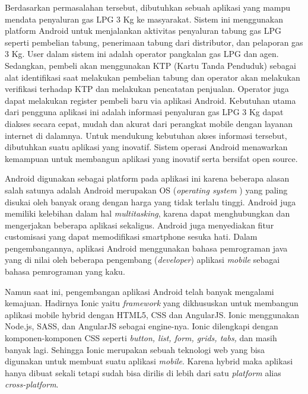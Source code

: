 \par Berdasarkan permasalahan tersebut, dibutuhkan sebuah aplikasi yang mampu mendata penyaluran gas LPG 3 Kg ke masyarakat. Sistem ini menggunakan platform Android untuk menjalankan aktivitas penyaluran tabung gas LPG seperti pembelian tabung, penerimaan tabung dari distributor, dan pelaporan gas 3 Kg. User dalam sistem ini adalah operator pangkalan gas LPG dan agen. Sedangkan, pembeli akan menggunakan KTP (Kartu Tanda Penduduk) sebagai alat identifikasi saat melakukan pembelian tabung dan operator akan melakukan verifikasi terhadap KTP dan melakukan pencatatan penjualan. Operator juga dapat melakukan register pembeli baru via aplikasi Android. Kebutuhan utama dari pengguna aplikasi ini adalah informasi penyaluran gas LPG 3 Kg dapat diakses secara cepat, mudah dan akurat dari perangkat mobile dengan layanan internet di dalamnya. Untuk mendukung kebutuhan akses informasi tersebut, dibutuhkan suatu aplikasi yang inovatif. Sistem operasi Android menawarkan kemampuan untuk membangun aplikasi yang inovatif serta bersifat open source.
\par Android digunakan sebagai platform pada aplikasi ini karena beberapa alasan salah satunya adalah Android merupakan OS (\textit{operating system }) yang paling disukai oleh banyak orang dengan harga yang tidak terlalu tinggi. Android juga memiliki kelebihan dalam hal \textit{multitasking}, karena dapat menghubungkan dan mengerjakan beberapa aplikasi sekaligus. Android juga menyediakan fitur customisasi yang dapat memodifikasi smartphone sesuka hati. Dalam pengembangannya, aplikasi Android menggunakan bahasa pemrograman java yang di nilai oleh beberapa pengembang (\textit{developer}) aplikasi \textit{mobile} sebagai bahasa pemrograman yang kaku.
\par Namun saat ini, pengembangan aplikasi Android telah banyak mengalami kemajuan. Hadirnya Ionic yaitu \textit{framework} yang dikhususkan untuk membangun aplikasi mobile hybrid dengan HTML5, CSS dan AngularJS. Ionic menggunakan Node.js, SASS, dan AngularJS sebagai engine-nya. Ionic dilengkapi dengan komponen-komponen CSS seperti \textit{button, list, form, grids, tabs,} dan masih banyak lagi. Sehingga Ionic merupakan sebuah teknologi web yang bisa digunakan untuk membuat suatu aplikasi \textit{mobile}. Karena hybrid maka aplikasi hanya dibuat sekali tetapi sudah bisa dirilis di lebih dari satu \textit{platform} alias \textit{cross-platform}.
